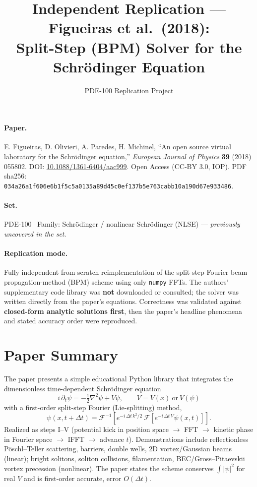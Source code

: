 \documentclass[11pt]{article}
\title{Independent Replication --- Figueiras et al.\ (2018):\\
Split-Step (BPM) Solver for the Schr\"odinger Equation}
\author{PDE-100 Replication Project}
\date{}
\begin{document}
\maketitle

\paragraph{Paper.} E. Figueiras, D. Olivieri, A. Paredes, H. Michinel,
``An open source virtual laboratory for the Schr\"odinger equation,''
\emph{European Journal of Physics} \textbf{39} (2018) 055802.
DOI: \href{https://doi.org/10.1088/1361-6404/aac999}{10.1088/1361-6404/aac999}.
Open Access (CC-BY 3.0, IOP). PDF sha256:
\texttt{034a26a1f606e6b1f5c5a0135a89d45c0ef137b5e763cabb10a190d67e933486}.

\paragraph{Set.} PDE-100 \textperiodcentered\ Family: Schr\"odinger / nonlinear
Schr\"odinger (NLSE) --- \emph{previously uncovered in the set}.

\paragraph{Replication mode.} Fully independent from-scratch reimplementation
of the split-step Fourier beam-propagation-method (BPM) scheme using only
\texttt{numpy} FFTs. The authors' supplementary code library was
\textbf{not} downloaded or consulted; the solver was written directly from
the paper's equations. Correctness was validated against \textbf{closed-form
analytic solutions first}, then the paper's headline phenomena and stated
accuracy order were reproduced.

\section{Paper Summary}
The paper presents a simple educational Python library that integrates the
dimensionless time-dependent Schr\"odinger equation
\begin{equation}
i\,\partial_t \psi = -\tfrac{1}{2}\nabla^2 \psi + V\psi, \qquad
V = V(x)\ \text{or}\ V(\psi) \label{eq:tdse}
\end{equation}
with a first-order split-step Fourier (Lie-splitting) method,
\begin{equation}
\psi(x, t+\Delta t) = \mathcal{F}^{-1}\!\left[
e^{-i\,\Delta t\,k^2/2}\,\mathcal{F}\!\left[e^{-i\,\Delta t\,V}\psi(x,t)\right]
\right]. \label{eq:splitstep}
\end{equation}
Realized as steps I--V (potential kick in position space $\to$ FFT $\to$
kinetic phase in Fourier space $\to$ IFFT $\to$ advance $t$). Demonstrations
include reflectionless P\"oschl--Teller scattering, barriers, double wells,
2D vortex/Gaussian beams (linear); bright solitons, soliton collisions,
filamentation, BEC/Gross--Pitaevskii vortex precession (nonlinear). The
paper states the scheme conserves $\int|\psi|^2$ for real $V$ and is
first-order accurate, error $O(\Delta t)$.
\end{document}
